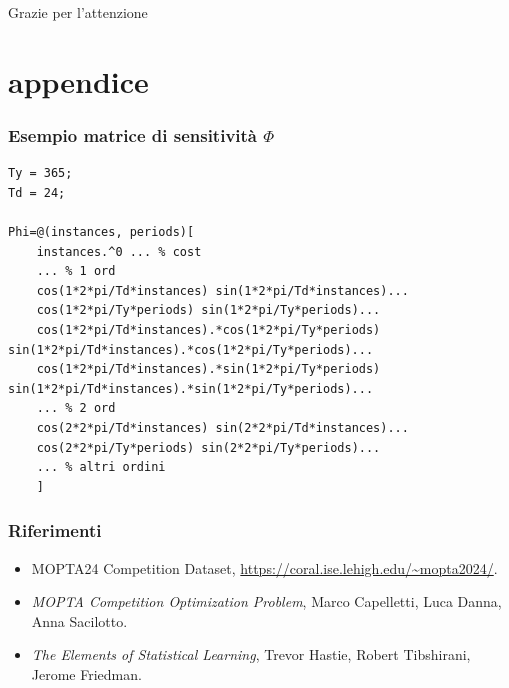 \documentclass{beamer}
\begin{document}
\begin{frame}
\begin{overlayarea}{\textwidth}{\textheight}
    \end{overlayarea}
\end{frame}

\begin{frame}
\Huge{\centerline{Grazie per l'attenzione}}
\end{frame}


\appendix
\setcounter{page}{1}
\renewcommand{\thepage}{A\arabic{page}}


\section{appendice}

\begin{frame}[fragile]
    \frametitle{Esempio matrice di sensitività $\Phi$}
\small 
\begin{lstlisting}
Ty = 365;
Td = 24;

Phi=@(instances, periods)[
    instances.^0 ... % cost
    ... % 1 ord
    cos(1*2*pi/Td*instances) sin(1*2*pi/Td*instances)...
    cos(1*2*pi/Ty*periods) sin(1*2*pi/Ty*periods)...
    cos(1*2*pi/Td*instances).*cos(1*2*pi/Ty*periods) sin(1*2*pi/Td*instances).*cos(1*2*pi/Ty*periods)...
    cos(1*2*pi/Td*instances).*sin(1*2*pi/Ty*periods) sin(1*2*pi/Td*instances).*sin(1*2*pi/Ty*periods)...
    ... % 2 ord
    cos(2*2*pi/Td*instances) sin(2*2*pi/Td*instances)... 
    cos(2*2*pi/Ty*periods) sin(2*2*pi/Ty*periods)...
    ... % altri ordini
    ]
\end{lstlisting}
    
\end{frame}

\begin{frame}
    \frametitle{Riferimenti}

    \begin{itemize}
        \item MOPTA24 Competition Dataset, \url{https://coral.ise.lehigh.edu/~mopta2024/}.
        \vspace{0.3cm}
        \item \textit{MOPTA Competition Optimization Problem}, Marco Capelletti, Luca Danna, Anna Sacilotto.
        \vspace{0.3cm}
        \item \textit{The Elements of
Statistical Learning}, Trevor Hastie, Robert Tibshirani, Jerome Friedman.
    \end{itemize}
\end{frame}
\end{document}
